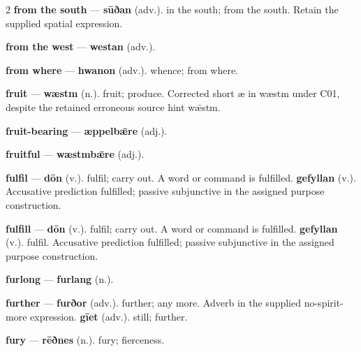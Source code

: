 \begin{multicols}{2}
\textbf{from the south} — \textbf{sūðan} (adv.). in the south; from the south. Retain the supplied spatial expression.\par
\textbf{from the west} — \textbf{westan} (adv.).\par
\textbf{from where} — \textbf{hwanon} (adv.). whence; from where.\par
\textbf{fruit} — \textbf{wæstm} (n.). fruit; produce. Corrected short æ in wæstm under C01, despite the retained erroneous source hint wǣstm.\par
\textbf{fruit-bearing} — \textbf{æppelbǣre} (adj.).\par
\textbf{fruitful} — \textbf{wæstmbǣre} (adj.).\par
\textbf{fulfil} — \textbf{dōn} (v.). fulfil; carry out. A word or command is fulfilled. \textbf{gefyllan} (v.). Accusative prediction fulfilled; passive subjunctive in the assigned purpose construction.\par
\textbf{fulfill} — \textbf{dōn} (v.). fulfil; carry out. A word or command is fulfilled. \textbf{gefyllan} (v.). fulfil. Accusative prediction fulfilled; passive subjunctive in the assigned purpose construction.\par
\textbf{furlong} — \textbf{furlang} (n.).\par
\textbf{further} — \textbf{furðor} (adv.). further; any more. Adverb in the supplied no-spirit-more expression. \textbf{gīet} (adv.). still; further.\par
\textbf{fury} — \textbf{rēðnes} (n.). fury; fierceness.\par

\end{multicols}

